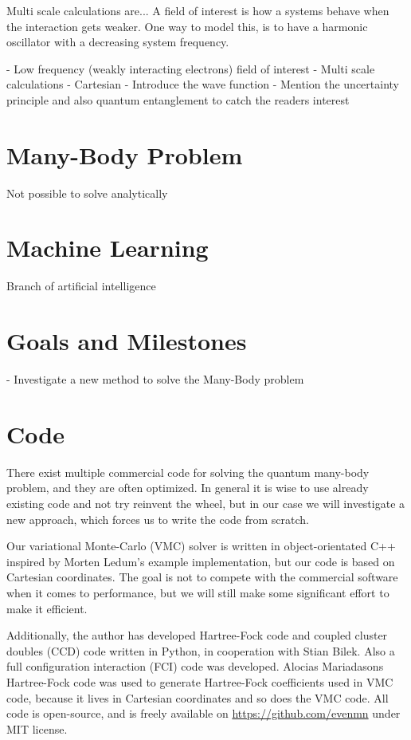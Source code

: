 Multi scale calculations are... A field of interest is how a systems behave when the interaction gets weaker. One way to model this, is to have a harmonic oscillator with a decreasing system frequency. 

 - Low frequency (weakly interacting electrons) field of interest
 - Multi scale calculations
 - Cartesian
 - Introduce the wave function
 - Mention the uncertainty principle and also quantum entanglement to catch the readers interest
 
\section{Many-Body Problem} \label{subsec:manybodyproblem}
Not possible to solve analytically

\section{Machine Learning} \label{subsec:machinelearning}
Branch of artificial intelligence

\section{Goals and Milestones} \label{subsec:goals}
- Investigate a new method to solve the Many-Body problem

\section{Code}
There exist multiple commercial code for solving the quantum many-body problem, and they are often optimized. In general it is wise to use already existing code and not try reinvent the wheel, but in our case we will investigate a new approach, which forces us to write the code from scratch.

Our variational Monte-Carlo (VMC) solver is written in object-orientated C++ inspired by Morten Ledum's example implementation, but our code is based on Cartesian coordinates. The goal is not to compete with the commercial software when it comes to performance, but we will still make some significant effort to make it efficient. 

Additionally, the author has developed Hartree-Fock code and coupled cluster doubles (CCD) code written in Python, in cooperation with Stian Bilek. Also a full configuration interaction (FCI) code was developed. Alocias Mariadasons Hartree-Fock code was used to generate Hartree-Fock coefficients used in VMC code, because it lives in Cartesian coordinates and so does the VMC code. All code is open-source, and is freely available on \url{https://github.com/evenmn} under MIT license. 

